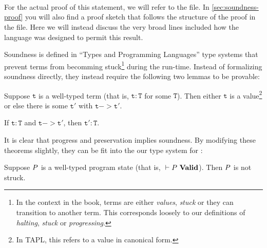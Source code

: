 \begin{code}
\> \AgdaSymbol{:}  \AgdaSymbol{\{}  \AgdaSymbol{\}} \<%
\\
\>[2]\<[20]%
\>[20]   \<%
\\
\>[2]\<[20]%
\>[20]    \AgdaFunction{/}  \<%
\\
\>[2]\<[20]%
\>[20] \<%
\end{code}

For the actual proof of this statement, we will refer to the file. In
\cref{sec:soundness-proof} you will also find a proof sketch that follows the
structure of the proof in the file. Here we will instead discuss the very broad
lines included how the language was designed to permit this result.

Soundness is defined in ``Types and Programming Languages''\cite{typesandprog}
type systems that prevent terms from becomming stuck\footnote{In the context in
  the book, terms are either \emph{values}, \emph{stuck} or they can transition
  to another term. This corresponds loosely to our definitions of
  \emph{halting}, \emph{stuck} or \emph{progressing}.} during the
run-time. Instead of formalizing soundness directly, they instead require the
following two lemmas to be provable:

\begin{theorem}[Progress]
  Suppose $\mathtt{t}$ is a well-typed term (that is, $\mathtt{t} : \mathtt{T}$
  for some $\mathtt{T}$). Then either $\mathtt{t}$ is a value\footnote{In TAPL,
    this refers to a value in canonical form.} or else there is some
  $\mathtt{t'}$ with $\mathtt{t} -> \mathtt{t'}$.
\end{theorem}

\begin{theorem}[Preservation]
  If $\mathtt{t} : \mathtt{T}$ and $\mathtt{t} -> \mathtt{t'}$, then
  $\mathtt{t'} : \mathtt{T}$.
\end{theorem}

It is clear that progress and preservation implies soundness. By modifying these
theorems slightly, they can be fit into the our type system for \ATAL:

\begin{theorem}
  \label{lemma:atalprogress}
  Suppose $P$ is a well-typed program state (that is,
  ${} |- {P}\ \mathbf{Valid}$). Then $P$ is not struck.
\end{theorem}

